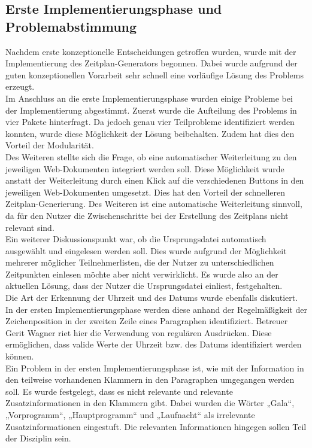 \subsection{Erste Implementierungsphase und Problemabstimmung}
Nachdem erste konzeptionelle Entscheidungen getroffen wurden, wurde mit der Implementierung des Zeitplan-Generators begonnen. Dabei wurde aufgrund der guten konzeptionellen Vorarbeit sehr schnell eine vorläufige Lösung des Problems erzeugt.\\
Im Anschluss an die erste Implementierungsphase wurden einige Probleme bei der Implementierung abgestimmt. Zuerst wurde die Aufteilung des Problems in vier Pakete hinterfragt. Da jedoch genau vier Teilprobleme identifiziert werden konnten, wurde diese Möglichkeit der Lösung beibehalten. Zudem hat dies den Vorteil der Modularität.\\
Des Weiteren stellte sich die Frage, ob eine automatischer Weiterleitung zu den jeweiligen Web-Dokumenten integriert werden soll. Diese Möglichkeit wurde anstatt der Weiterleitung durch einen Klick auf die verschiedenen Buttons in den jeweiligen Web-Dokumenten umgesetzt. Dies hat den Vorteil der schnelleren Zeitplan-Generierung. Des Weiteren ist eine automatische Weiterleitung sinnvoll, da für den Nutzer die Zwischenschritte bei der Erstellung des Zeitplans nicht relevant sind. \\
Ein weiterer Diskussionspunkt war, ob die Ursprungsdatei automatisch ausgewählt und eingelesen werden soll. Dies wurde aufgrund der Möglichkeit mehrerer möglicher Teilnehmerlisten, die der Nutzer zu unterschiedlichen Zeitpunkten einlesen möchte aber nicht verwirklicht. Es wurde also an der aktuellen Lösung, dass der Nutzer die Ursprungsdatei einliest, festgehalten.\\
Die Art der Erkennung der Uhrzeit und des Datums wurde ebenfalls diskutiert. In der ersten Implementierungsphase werden diese anhand der Regelmäßigkeit der Zeichenposition in der zweiten Zeile eines Paragraphen identifiziert. Betreuer Gerit Wagner riet hier die Verwendung von regulären Ausdrücken. Diese ermöglichen, dass valide Werte der Uhrzeit bzw. des Datums identifiziert werden können.\\
Ein Problem in der ersten Implementierungsphase ist, wie mit der Information in den teilweise vorhandenen Klammern in den Paragraphen umgegangen werden soll. Es wurde festgelegt, dass es nicht relevante und relevante Zusatzinformationen in den Klammern gibt. Dabei wurden die Wörter „Gala“, „Vorprogramm“, „Hauptprogramm“ und „Laufnacht“ als irrelevante Zusatzinformationen eingestuft. Die relevanten Informationen hingegen sollen Teil der Disziplin sein.\\

